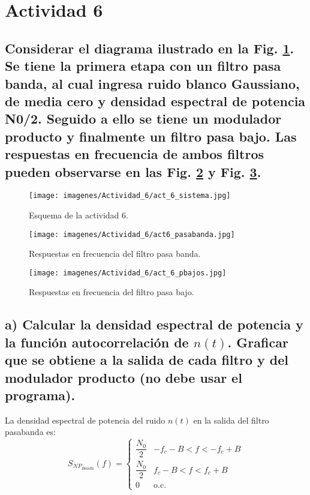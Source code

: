 \section{Actividad 6}

\subsection*{Considerar el diagrama ilustrado en la Fig. \ref{sistema}. Se tiene la primera etapa con un filtro pasa banda, al cual
ingresa ruido blanco Gaussiano, de media cero y densidad espectral de potencia N0/2. Seguido a ello se tiene un modulador producto y 
finalmente un filtro pasa bajo. Las respuestas en frecuencia de ambos filtros pueden observarse en las Fig. \ref{pasabanda} y
Fig. \ref{pasabajo}.}


	\begin{figure}[H]
		\centering
		\texttt{[image: imagenes/Actividad\_6/act\_6\_sistema.jpg]}
		\caption{Esquema de la actividad 6.}
		\label{sistema}
	\end{figure}

	\begin{figure}[H]
		\centering
		\texttt{[image: imagenes/Actividad\_6/act6\_pasabanda.jpg]}
		\caption{Respuestas en frecuencia del filtro pasa banda.}
		\label{pasabanda}
	\end{figure}

	\begin{figure}[H]
		\centering
		\texttt{[image: imagenes/Actividad\_6/act\_6\_pbajos.jpg]}
		\caption{Respuestas en frecuencia del filtro pasa bajo.}
		\label{pasabajo}
	\end{figure}



\subsection*{a) Calcular la densidad espectral de potencia y la función autocorrelación de $n(t)$. Graficar que se obtiene a la salida 
de cada filtro y del modulador producto (no debe usar el programa).} \par

	La densidad espectral de potencia del ruido $n(t)$ en la salida del filtro pasabanda es:
		\[
			S_{NP_{Banda}}(f) =
			\begin{cases}
			\dfrac{N_0}{2} & -f_c - B < f < -f_c + B \\[6pt]
			\dfrac{N_0}{2} & f_c - B < f < f_c + B \\[6pt]
			0 & \text{o.c.}
			\end{cases}
		\]

